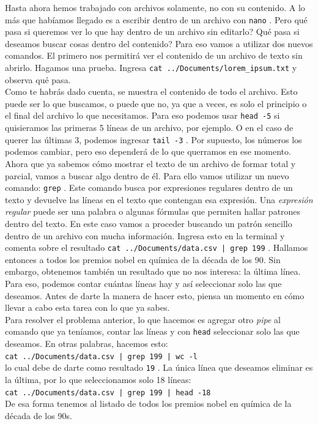 \documentclass[10pt,letterpaper]{article}
\newcommand{\inlinecode}[1]{
\colorbox{light-gray}{\texttt{#1}}
}
\begin{document}
Hasta ahora hemos trabajado con archivos solamente, no con su contenido. A lo m\'as que hab\'iamos llegado es a escribir dentro de un archivo con \inlinecode{nano}. Pero qu\'e pasa si queremos ver lo que hay dentro de un archivo sin editarlo? Qu\'e pasa si deseamos buscar cosas dentro del contenido? Para eso vamos a utilizar dos nuevos comandos. El primero nos permitir\'a ver el contenido de un archivo de texto sin abrirlo. Hagamos una prueba. Ingresa \inlinecode{cat ../Documents/lorem\_ipsum.txt} y observa qu\'e pasa.\\

Como te habr\'as dado cuenta, se muestra el contenido de todo el archivo. Esto puede ser lo que buscamos, o puede que no, ya que a veces, es solo el principio o el final del archivo lo que necesitamos. Para eso podemos usar \inlinecode{head -5} si quisieramos las primeras 5 l\'ineas de un archivo, por ejemplo. O en el caso de querer las \'ultimas 3, podemos ingresar \inlinecode{tail -3}. Por supuesto, los n\'umeros los podemos cambiar, pero eso depender\'a de lo que querramos en ese momento.\\

Ahora que ya sabemos c\'omo mostrar el texto de un archivo de formar total y parcial, vamos a buscar algo dentro de \'el. Para ello vamos utilizar un nuevo comando: \inlinecode{grep}. Este comando busca por expresiones regulares dentro de un texto y devuelve las l\'ineas en el texto que contengan esa expresi\'on. Una \emph{expresi\'on regular} puede ser una palabra o algunas f\'ormulas que permiten hallar patrones dentro del texto. En este caso vamos a proceder buscando un patr\'on sencillo dentro de un archivo con mucha informaci\'on. Ingresa esto en la terminal y comenta sobre el resultado \inlinecode{cat ../Documents/data.csv | grep 199}. Hallamos entonces a todos los premios nobel en qu\'imica de la d\'ecada de los 90. Sin embargo, obtenemos tambi\'en un resultado que no nos interesa: la \'ultima l\'inea. Para eso, podemos contar cu\'antas l\'ineas hay y as\'i seleccionar solo las que deseamos. Antes de darte la manera de hacer esto, piensa un momento en c\'omo llevar a cabo esta tarea con lo que ya sabes.\\

Para resolver el problema anterior, lo que hacemos es agregar otro \emph{pipe} al comando que ya ten\'iamos, contar las l\'ineas y con \inlinecode{head} seleccionar solo las que deseamos. En otras palabras, hacemos esto:\\
\inlinecode{cat ../Documents/data.csv | grep 199 | wc -l}\\
lo cual debe de darte como resultado \inlinecode{19}. La \'unica l\'inea que deseamos eliminar es la \'ultima, por lo que seleccionamos solo 18 l\'ineas:\\
\inlinecode{cat ../Documents/data.csv | grep 199 | head -18}\\
De esa forma tenemos al listado de todos los premios nobel en qu\'imica de la d\'ecada de los 90s.
\end{document}
